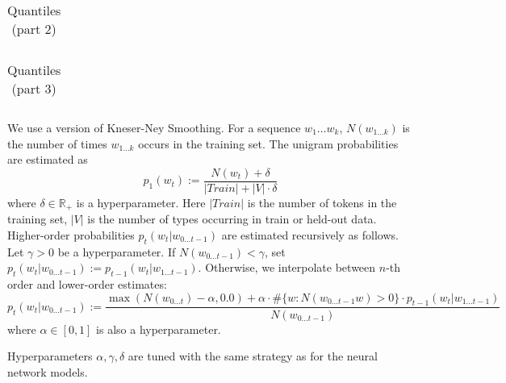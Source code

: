 \begin{table}[!htbp]
\begin{tabular}{cccccccccccccccccc}

\end{tabular}
	\caption{Quantiles (part 2)}
\end{table}

\begin{table}[!htbp]
\begin{tabular}{cccccccccccccccccc}

\end{tabular}
	\caption{Quantiles (part 3)}
\end{table}
%

We use a version of Kneser-Ney Smoothing.
For a sequence $w_1\dots w_k$, $N(w_{1\dots k})$ is the number of times $w_{1\dots k}$ occurs in the training set.
The unigram probabilities are estimated as
\begin{equation}
	p_1(w_t) :=   \frac{N(w_t) + \delta}{|Train| + |V| \cdot \delta}
\end{equation}
where $\delta \in \mathbb{R}_+$ is a hyperparameter.
Here $|Train|$ is the number of tokens in the training set, $|V|$ is the number of types occurring in train or held-out data.
Higher-order probabilities $p_t(w_t|w_{0 \dots t-1})$ are estimated recursively as follows.
Let $\gamma > 0$ be a hyperparameter.
If $N(w_{0 \dots t-1}) < \gamma$, set $p_t(w_t|w_{0 \dots t-1}) := p_{t-1}(w_t|w_{1\dots t-1})$.
Otherwise, we interpolate between $n$-th order and lower-order estimates:
\begin{equation}
	p_t(w_t|w_{0 \dots t-1}) :=  \frac{\operatorname{max}(N(w_{0\dots t}) - \alpha, 0.0) + \alpha \cdot \#\{w : N(w_{0 \dots t-1}w) > 0\} \cdot p_{t-1}(w_t|w_{1\dots t-1})}{N(w_{0\dots t-1})}
\end{equation}
where $\alpha \in [0,1]$ is also a hyperparameter.

Hyperparameters $\alpha, \gamma, \delta$ are tuned with the same strategy as for the neural network models.




